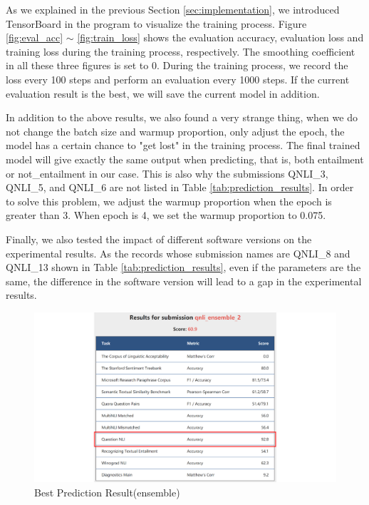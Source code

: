 \documentclass[10pt,journal,compsoc]{IEEEtran}
\begin{document}
As we explained in the previous Section \ref{sec:implementation}, we introduced TensorBoard in the program to visualize the training process. Figure \ref{fig:eval_acc} $\sim$ \ref{fig:train_loss} shows the evaluation accuracy, evaluation loss and training loss during the training process, respectively. The smoothing coefficient in all these three figures is set to 0. During the training process, we record the loss every 100 steps and perform an evaluation every 1000 steps. If the current evaluation result is the best, we will save the current model in addition.

In addition to the above results, we also found a very strange thing, when we do not change the batch size and warmup proportion, only adjust the epoch, the model has a certain chance to "get lost" in the training process. The final trained model will give exactly the same output when predicting, that is, both entailment or not\_entailment in our case. This is also why the submissions QNLI\_3, QNLI\_5, and QNLI\_6 are not listed in Table \ref{tab:prediction_results}. In order to solve this problem, we adjust the warmup proportion when the epoch is greater than 3. When epoch is 4, we set the warmup proportion to 0.075.

Finally, we also tested the impact of different software versions on the experimental results. As the records whose submission names are QNLI\_8 and QNLI\_13 shown in Table \ref{tab:prediction_results}, even if the parameters are the same, the difference in the software version will lead to a gap in the experimental results.


\begin{figure}[!t]
  \centering
  \includegraphics[width=1\linewidth]{images/best_ensemble}
  \caption{Best Prediction Result(ensemble)}
  \label{fig:best_ensemble}
\end{figure}
\end{document}
